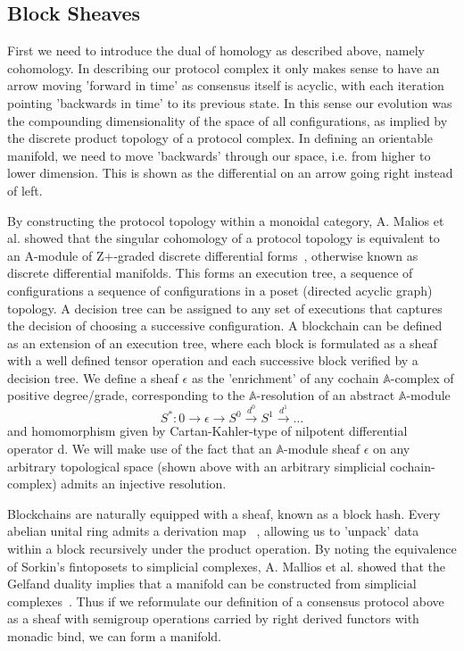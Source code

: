\documentclass[runningheads]{llncs}
\begin{document}
\subsection{Block Sheaves}
First we need to introduce the dual of homology as described above, namely cohomology. In describing our protocol complex it only makes sense to have an arrow moving 'forward in time' as consensus itself is acyclic, with each iteration pointing 'backwards in time' to its previous state. In this sense our evolution was the compounding dimensionality of the space of all configurations, as implied by the discrete product topology of a protocol complex. In defining an orientable manifold, we need to move 'backwards' through our space, i.e. from higher to lower dimension. This is shown as the differential on an arrow going right instead of left.

By constructing the protocol topology within a monoidal category, A. Malios et al. showed that the singular cohomology of a protocol topology is equivalent to an A-module of Z+-graded discrete differential forms~\cite{ref_article6}, otherwise known as discrete differential manifolds. This forms an execution tree, a sequence of configurations a sequence of configurations in a poset (directed acyclic graph) topology. A decision tree can be assigned to any set of executions that captures the decision of choosing a successive configuration. A blockchain can be defined as an extension of an execution tree, where each block is formulated as a sheaf with a well defined tensor operation and each successive block verified by a decision tree. We define a sheaf $\epsilon$ as the 'enrichment' of any cochain $\mathbb{A}$-complex of positive degree/grade, corresponding to the $\mathbb{A}$-resolution of an abstract $\mathbb{A}$-module
\begin{equation}
S^*: 0 \rightarrow \epsilon \rightarrow S^0 \xrightarrow{d^0} S^1 \xrightarrow{d^1} \dots
\end{equation}
and homomorphism given by Cartan-Kahler-type of nilpotent differential operator d. We will make use of the fact that an $\mathbb{A}$-module sheaf $\epsilon$ on any arbitrary topological space (shown above with an arbitrary simplicial cochain-complex) admits an injective resolution.

Blockchains are naturally equipped with a sheaf, known as a block hash. Every abelian unital ring admits a derivation map ~\cite{ref_article7}, allowing us to 'unpack' data within a block recursively under the product operation. By noting the equivalence of Sorkin's fintoposets to simplicial complexes, A. Mallios et al. showed that the Gelfand duality implies that a manifold can be constructed from simplicial complexes~\cite{ref_article6}. Thus if we reformulate our definition of a consensus protocol above as a sheaf with semigroup operations carried by right derived functors with monadic bind, we can form a manifold.
\end{document}
